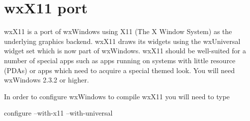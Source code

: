 \section{wxX11 port}\label{wxx11port}

wxX11 is a port of wxWindows using X11 (The X Window System)
as the underlying graphics backend. wxX11 draws its widgets
using the wxUniversal widget set which is now part of wxWindows.
wxX11 should be well-suited for a number of special apps such
as apps running on systems with little resource (PDAs) or apps
which need to acquire a special themed look. You will need
wxWindows 2.3.2 or higher.
  
In order to configure wxWindows to compile wxX11 you will 
need to type

  configure --with-x11 --with-universal
  
